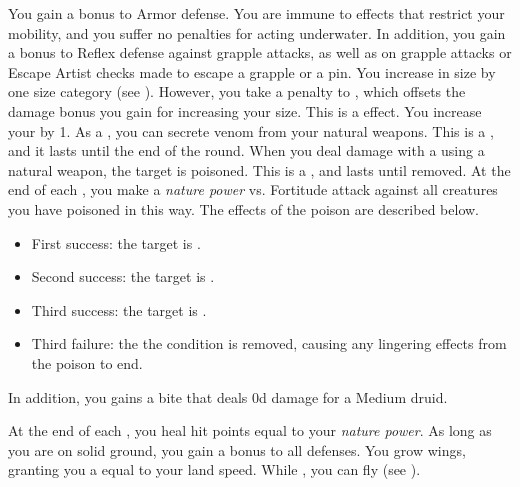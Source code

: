          You gain a  bonus to Armor defense.
         You are immune to effects that restrict your mobility, and you suffer no penalties for acting underwater.
        In addition, you gain a  bonus to Reflex defense against grapple attacks, as well as on grapple attacks or Escape Artist checks made to escape a grapple or a pin.
        You increase in size by one size category (see ).
        However, you take a  penalty to , which offsets the damage bonus you gain for increasing your size.
        This is a  effect.
        You increase your  by 1.
        As a , you can secrete venom from your natural weapons.
        This is a , and it lasts until the end of the round.
        When you deal damage with a  using a natural weapon, the target is poisoned.
        This is a , and lasts until removed.
        At the end of each , you make a \textit{nature power} vs. Fortitude attack against all creatures you have poisoned in this way.
        The effects of the poison are described below.
        \begin{itemize}
            \item First success: the target is \sickened.
            \item Second success: the target is \nauseated.
            \item Third success: the target is \paralyzed.
            \item Third failure: the the condition is removed, causing any lingering effects from the poison to end.
        \end{itemize}
        \par In addition, you gains a bite  that deals \plus0d damage for a Medium druid.

        At the end of each , you heal hit points equal to your \textit{nature power}.
         As long as you are on solid ground, you gain a  bonus to all defenses.
        You grow wings, granting you a  equal to your land speed.
        While , you can fly (see ).

